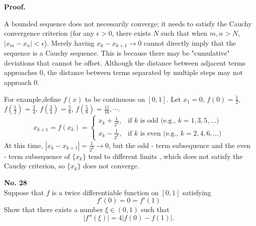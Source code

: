 \documentclass[a4paper, 11pt]{article}
\newenvironment{problem}[2][No.]
    { \begin{mdframed}[backgroundcolor=gray!5] \textbf{#1 #2} \\}
    {  \end{mdframed}}
\newenvironment{solution}
    {\textbf{Proof.}}
    {}
\begin{document}
\begin{solution}
	
A bounded sequence does not necessarily converge; it needs to satisfy the Cauchy convergence criterion (for any \(\epsilon > 0\), there exists \(N\) such that when \(m, n > N\), \(|x_m - x_n| < \epsilon\)). Merely having \(x_k - x_{k + 1} \to 0\) cannot directly imply that the sequence is a Cauchy sequence. This is because there may be "cumulative" deviations that cannot be offset. Although the distance between adjacent terms approaches 0, the distance between terms separated by multiple steps may not approach 0. 

For example,define \( f(x) \) to be continuous on \([0, 1]\). Let \( x_1 = 0 \), \( f(0)=\frac{1}{2} \), \( f\left(\frac{1}{2}\right)=\frac{3}{4} \), \( f\left(\frac{3}{4}\right)=\frac{5}{8} \), \( f\left(\frac{5}{8}\right)=\frac{11}{16}, \cdots \). 
$$
x_{k + 1} = f(x_k) = 
\begin{cases} 
	x_k + \frac{1}{2^k}, & \text{if } k \text{ is odd (e.g., } k = 1, 3, 5, \ldots\text{)} \\
	x_k - \frac{1}{2^k}, & \text{if } k \text{ is even (e.g., } k = 2, 4, 6, \ldots\text{)} 
\end{cases}
$$
At this time, \( |x_k - x_{k + 1}| = \frac{1}{2^k} \to 0 \), but the odd - term subsequence and the even - term subsequence of \( \{x_k\} \) tend to different limits , which does not satisfy the Cauchy criterion, so \( \{x_k\} \) does not converge.
\end{solution}

\begin{problem}{28}
Suppose that \( f \) is a twice differentiable function on \([0,1]\) satisfying 
$$
f'(0) = 0 = f'(1)
$$
Show that there exists a number \( \xi \in (0,1) \) such that 
$$
|f''(\xi)| = 4|f(0) - f(1)|.
$$
\end{problem}
\end{document}
